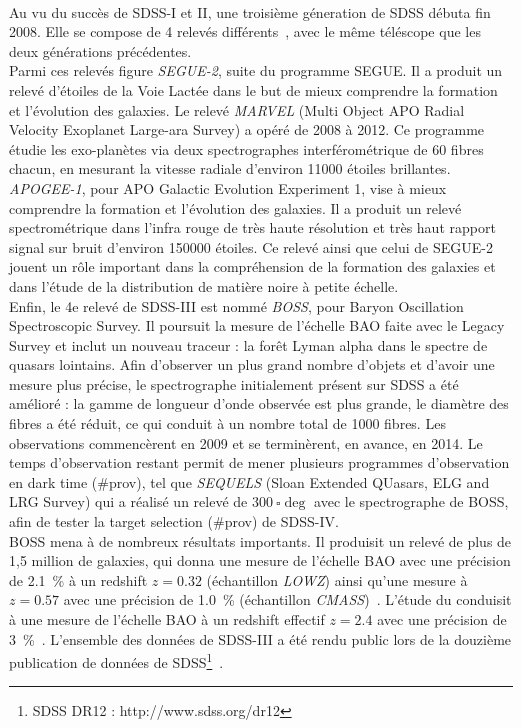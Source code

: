 \paragraph{}
Au vu du succès de SDSS-I et II, une troisième géneration de SDSS débuta fin 2008. Elle se compose de 4 relevés différents~\cite{Eisenstein2011}, avec le même téléscope que les deux générations précédentes. \\
Parmi ces relevés figure \emph{SEGUE-2}, suite du programme SEGUE. Il a produit un relevé d'étoiles de la Voie Lactée dans le but de mieux comprendre la formation et l'évolution des galaxies. Le relevé \emph{MARVEL} (Multi Object APO Radial Velocity Exoplanet Large-ara Survey) a opéré de 2008 à 2012. Ce programme étudie les exo-planètes via deux spectrographes interférométrique de 60 fibres chacun, en mesurant la vitesse radiale d'environ \num{11000} étoiles brillantes. \emph{APOGEE-1}, pour APO Galactic Evolution Experiment 1, vise à mieux comprendre la formation et l'évolution des galaxies. Il a produit un relevé spectrométrique dans l'infra rouge de très haute résolution et très haut rapport signal sur bruit d'environ \num{150000} étoiles. Ce relevé ainsi que celui de SEGUE-2 jouent un rôle important dans la compréhension de la formation des galaxies et dans l'étude de la distribution de matière noire à petite échelle.\\
Enfin, le 4e relevé de SDSS-III est nommé \emph{BOSS}, pour Baryon Oscillation Spectroscopic Survey. Il poursuit la mesure de l'échelle BAO faite avec le Legacy Survey et inclut un nouveau traceur : la forêt Lyman alpha dans le spectre de quasars lointains. Afin d'observer un plus grand nombre d'objets et d'avoir une mesure plus précise, le spectrographe initialement présent sur SDSS a été amélioré : la gamme de longueur d'onde observée est plus grande, le diamètre des fibres a été réduit, ce qui conduit à un nombre total de \num{1000} fibres. Les observations commencèrent en 2009 et se terminèrent, en avance, en 2014. Le temps d'observation restant permit de mener plusieurs programmes d'observation en dark time (\#prov), tel que \emph{SEQUELS} (Sloan Extended QUasars, ELG and LRG Survey) qui a réalisé un relevé de $\SI{300}{\square\deg}$ avec le spectrographe de BOSS, afin de tester la target selection (\#prov) de SDSS-IV.\\
BOSS mena à de nombreux résultats importants. Il produisit un relevé de plus de 1,5 million de galaxies, qui donna une mesure de l'échelle BAO avec une précision de \SI{2,1}{\percent} à un redshift $z=\num{0,32}$ (échantillon \emph{LOWZ}) ainsi qu'une mesure à $z=\num{0,57}$ avec une précision de \SI{1,0}{\percent} (échantillon \emph{CMASS})~\cite{Alam2016}. L'étude du \lya{} conduisit à une mesure de l'échelle BAO à un redshift effectif $z=\num{2,4}$ avec une précision de \SI{3}{\percent}~\cite{Bourboux2019}.
L'ensemble des données de SDSS-III a été rendu public lors de la douzième publication de données de SDSS\footnote{SDSS DR12 : http://www.sdss.org/dr12}~\cite{Alam2015}.


